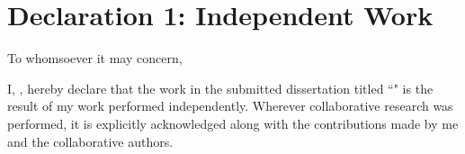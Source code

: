 \documentclass[a4paper,12pt,leqno,openbib]{memoir}
\begin{document}
{}

\chapter*{Declaration 1: Independent Work}
\vspace{4cm}

To whomsoever it may concern,

I, \utsname, hereby declare that the work in the submitted dissertation titled ``\utstitle" is the result of my work performed independently. Wherever collaborative research was performed, it is explicitly acknowledged along with the contributions made by me and the collaborative authors. 


\noindent

\vspace{4cm}
\noindent
{}
\end{document}
